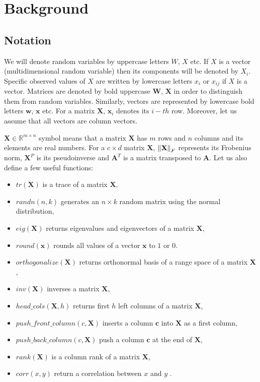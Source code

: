 
\chapter{Background}
\section{Notation}

We will denote random variables by uppercase letters $W$, $X$ etc. If $X$ is a vector (multidimensional random variable) then its components will be denoted by $X_i$. Specific observed values of $X$ are written by lowercase letters $x_i$ or $x_{ij}$ if $X$ is a vector. Matrices are denoted by bold uppercase $\boldsymbol{W}$, $\boldsymbol{X}$ in order to distinguish them from random variables. Similarly, vectors are represented by lowercase bold letters $\boldsymbol{w}$, $\boldsymbol{x}$ etc. For a matrix $\boldsymbol{X}$, $\boldsymbol{x}_{i}$ denotes its $i-th$ row. Moreover, let us assume that all vectors are column vectors. 

$\boldsymbol{X} \in \mathbb{R}^{m \times n}$ symbol means that a matrix $\boldsymbol{X}$ has $m$ rows and $n$ columns and its elements are real numbers. For a $c \times d$  matrix $\boldsymbol{X}$, $\left\lVert\textbf{X}\right\rVert_{F}$ represents its Frobenius norm, $\textbf{X}^P$ is its pseudoinverse and $\textbf{A}^T$ is a matrix transposed to $\textbf{A}$. 
Let us also define a few useful functions:
\begin{itemize}
\item $tr(\boldsymbol{X})$ is a trace of a matrix $\boldsymbol{X}$, 
\item $randn(n,k)$ generates an $n \times k$ random matrix using the normal distribution,
\item $eig(\boldsymbol{X})$ returns eigenvalues and eigenvectors of a matrix $\boldsymbol{X}$,
\item $round(\boldsymbol{x})$ rounds all values of a vector $\boldsymbol{x}$ to $1$ or $0$.
\item $orthogonalize(\boldsymbol{X})$ returns orthonormal basis of a range space of a matrix $\boldsymbol{X}$,
\item $inv(\boldsymbol{X})$ inverses a matrix $\boldsymbol{X}$,
\item $head\_cols(\boldsymbol{X},h)$ returns first $h$ left columns of a matrix $\boldsymbol{X}$,
\item $push\_front\_column(c,\boldsymbol{X})$ inserts a column $\boldsymbol{c}$ into $\boldsymbol{X}$ as a first column,
\item $push\_back\_column(c,\boldsymbol{X})$ push a column $\boldsymbol{c}$ at the end of $\boldsymbol{X}$,
\item $rank(\boldsymbol{X})$ is a column rank of a matrix $\boldsymbol{X}$,
\item $corr(x,y)$ return a correlation between $x$ and $y$ . 

\end{itemize}

